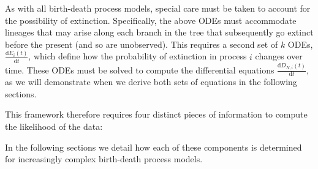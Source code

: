 	As with all birth-death process models, special care must be taken to account for the possibility of extinction.
	Specifically, the above ODEs must accommodate lineages that may arise along each branch in the tree that subsequently go extinct before the present (and so are unobserved).
	This requires a second set of $k$ ODEs, $\frac{ \mathrm{d}E_{i}(t)}{\mathrm{d}t}$, which define how the probability of extinction in process $i$ changes over time.
	These ODEs must be solved to compute the differential equations $\frac{ \mathrm{d}D_{N,i}(t)}{\mathrm{d}t}$, as we will demonstrate when we derive both sets of equations in the following sections.

	This framework therefore requires four distinct pieces of information to compute the likelihood of the data:

	In the following sections we detail how each of these components is determined for increasingly complex birth-death process models.


